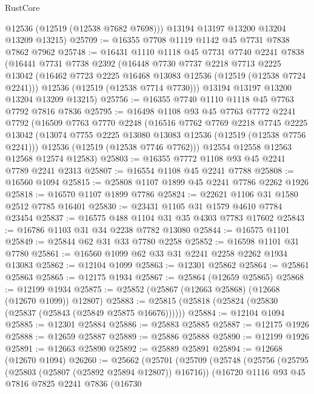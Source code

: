 \begin{lexlean}{RustCore}
\begin{coremodule}
        @12536
        (@12519 (@12538 @7682 @7698)))
      @13194
      @13197
      @13200
      @13204
      @13209
      @13215)
@25709 := @16355 @7708 @1119 @1142 @45 @7731 @7838 @7862 @7962
@25748 := @16431
    @1110
    @1118
    @45
    @7731
    @7740
    @2241
    @7838
    (@16441
      @7731
      @7738
      @2392
      (@16448
        @7730
        @7737
        @2218
        @7713
        @2225
        @13042
        (@16462 @7723 @2225 @16468 @13083 @12536 (@12519 (@12538 @7724 @2241)))
        @12536
        (@12519 (@12538 @7714 @7730)))
      @13194
      @13197
      @13200
      @13204
      @13209
      @13215)
@25756 := @16355 @7740 @1110 @1118 @45 @7763 @7792 @7816 @7836
@25795 := @16498
    @1108
    @93
    @45
    @7763
    @7772
    @2241
    @7792
    (@16509
      @7763
      @7770
      @2248
      (@16516
        @7762
        @7769
        @2218
        @7745
        @2225
        @13042
        (@13074 @7755 @2225 @13080 @13083 @12536 (@12519 (@12538 @7756 @2241)))
        @12536
        (@12519 (@12538 @7746 @7762)))
      @12554
      @12558
      @12563
      @12568
      @12574
      @12583)
@25803 := @16355 @7772 @1108 @93 @45 @2241 @7789 @2241 @2313
@25807 := @16554 @1108 @45 @2241 @7788
@25808 := @16560 @1094
@25815 := @25808 @1107 @1899 @45 @2241 @7786 @2262 @1926
@25818 := @16570 @1107 @1899 @7786
@25824 := @22621 @1106 @31 @1580 @2512 @7785 @16401
@25830 := @23431 @1105 @31 @1579 @4610 @7784 @23454
@25837 := @16575 @488 @1104 @31 @35 @4303 @7783 @17602
@25843 := @16786 @1103 @31 @34 @2238 @7782 @13080
@25844 := @16575 @1101
@25849 := @25844 @62 @31 @33 @7780 @2258
@25852 := @16598 @1101 @31 @7780
@25861 := @16560 @1099 @62 @33 @31 @2241 @2258 @2262 @1934 @13083
@25862 := @12104 @1099
@25863 := @12301 @25862
@25864 := @25861 @25863
@25865 := @12175 @1934
@25867 := @25864 (@12659 @25865)
@25868 := @12199 @1934
@25875 := @25852 (@25867 (@12663 @25868) (@12668 (@12670 @1099)) @12807)
@25883 := @25815 (@25818 (@25824 (@25830 (@25837 (@25843 (@25849 @25875 @16676))))))
@25884 := @12104 @1094
@25885 := @12301 @25884
@25886 := @25883 @25885
@25887 := @12175 @1926
@25888 := @12659 @25887
@25889 := @25886 @25888
@25890 := @12199 @1926
@25891 := @12663 @25890
@25892 := @25889 @25891
@25894 := @12668 (@12670 @1094)
@26260 := @25662
    (@25701
      (@25709
        (@25748
          (@25756
            (@25795 (@25803 (@25807 (@25892 @25894 @12807)) @16716))
            (@16720
              @1116
              @93
              @45
              @7816
              @7825
              @2241
              @7836
              (@16730

\end{coremodule}
\end{lexlean}
